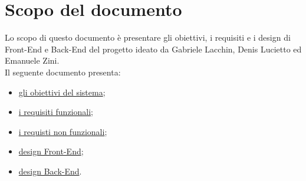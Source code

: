 \section*{Scopo del documento}
Lo scopo di questo documento è presentare gli obiettivi, i requisiti e i design di Front-End e Back-End del progetto \nome ideato da Gabriele Lacchin, Denis Lucietto ed Emanuele Zini.\\
Il seguente documento presenta:
\begin{itemize}
    \item \hyperref[sec:ObiettiviProgetto]{gli obiettivi del sistema};
    \item \hyperref[sec:RequisitiFunzionali]{i requisiti funzionali};
    \item \hyperref[sec:RequisitiNonFunzionali]{i requisti non funzionali};
    \item \hyperref[sec:RequisitiFrontEnd]{design Front-End};
    \item \hyperref[sec:RequisitiBackEnd]{design Back-End}.
\end{itemize}